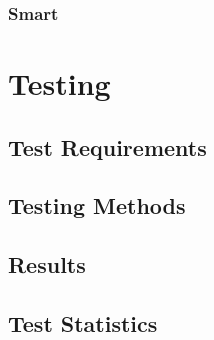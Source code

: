 \subsection{Smart}


\chapter{Testing}
\section{Test Requirements}
\section{Testing Methods}
\section{Results}
\section{Test Statistics}


